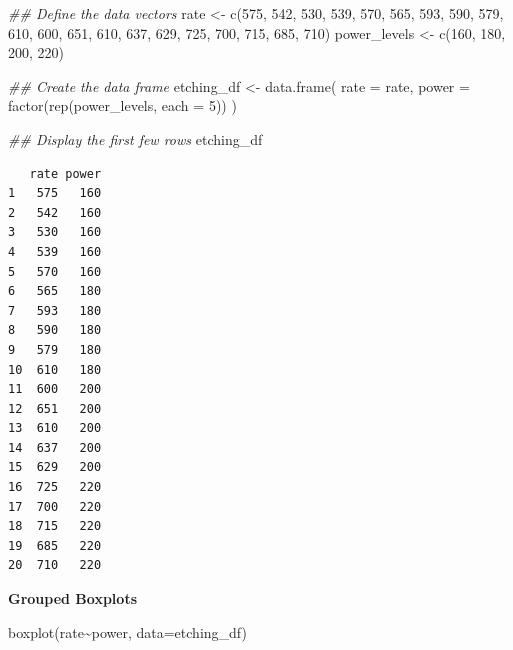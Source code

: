 \documentclass[
  letterpaper,
]{scrbook}
\newenvironment{Shaded}{\begin{snugshade}}{\end{snugshade}}
\newcommand{\AttributeTok}[1]{\textcolor[rgb]{0.40,0.45,0.13}{#1}}
\newcommand{\DecValTok}[1]{\textcolor[rgb]{0.68,0.00,0.00}{#1}}
\newcommand{\DocumentationTok}[1]{\textcolor[rgb]{0.37,0.37,0.37}{\textit{#1}}}
\newcommand{\FunctionTok}[1]{\textcolor[rgb]{0.28,0.35,0.67}{#1}}
\newcommand{\NormalTok}[1]{\textcolor[rgb]{0.00,0.23,0.31}{#1}}
\newcommand{\OtherTok}[1]{\textcolor[rgb]{0.00,0.23,0.31}{#1}}
\newcommand{\SpecialCharTok}[1]{\textcolor[rgb]{0.37,0.37,0.37}{#1}}
\begin{document}
\begin{Shaded}
\begin{Highlighting}[]
\DocumentationTok{\#\# Define the data vectors}
\NormalTok{rate }\OtherTok{\textless{}{-}} \FunctionTok{c}\NormalTok{(}\DecValTok{575}\NormalTok{, }\DecValTok{542}\NormalTok{, }\DecValTok{530}\NormalTok{, }\DecValTok{539}\NormalTok{, }\DecValTok{570}\NormalTok{, }\DecValTok{565}\NormalTok{, }\DecValTok{593}\NormalTok{, }\DecValTok{590}\NormalTok{, }\DecValTok{579}\NormalTok{, }\DecValTok{610}\NormalTok{,}
          \DecValTok{600}\NormalTok{, }\DecValTok{651}\NormalTok{, }\DecValTok{610}\NormalTok{, }\DecValTok{637}\NormalTok{, }\DecValTok{629}\NormalTok{, }\DecValTok{725}\NormalTok{, }\DecValTok{700}\NormalTok{, }\DecValTok{715}\NormalTok{, }\DecValTok{685}\NormalTok{, }\DecValTok{710}\NormalTok{)}
\NormalTok{power\_levels }\OtherTok{\textless{}{-}} \FunctionTok{c}\NormalTok{(}\DecValTok{160}\NormalTok{, }\DecValTok{180}\NormalTok{, }\DecValTok{200}\NormalTok{, }\DecValTok{220}\NormalTok{)}

\DocumentationTok{\#\# Create the data frame}
\NormalTok{etching\_df }\OtherTok{\textless{}{-}} \FunctionTok{data.frame}\NormalTok{(}
  \AttributeTok{rate =}\NormalTok{ rate,}
  \AttributeTok{power =} \FunctionTok{factor}\NormalTok{(}\FunctionTok{rep}\NormalTok{(power\_levels, }\AttributeTok{each =} \DecValTok{5}\NormalTok{))}
\NormalTok{)}

\DocumentationTok{\#\# Display the first few rows}
\NormalTok{etching\_df}
\end{Highlighting}
\end{Shaded}

\begin{verbatim}
   rate power
1   575   160
2   542   160
3   530   160
4   539   160
5   570   160
6   565   180
7   593   180
8   590   180
9   579   180
10  610   180
11  600   200
12  651   200
13  610   200
14  637   200
15  629   200
16  725   220
17  700   220
18  715   220
19  685   220
20  710   220
\end{verbatim}

\textbf{Grouped Boxplots}

\begin{Shaded}
\begin{Highlighting}[]
\FunctionTok{boxplot}\NormalTok{(rate}\SpecialCharTok{\textasciitilde{}}\NormalTok{power, }\AttributeTok{data=}\NormalTok{etching\_df)}
\end{Highlighting}
\end{Shaded}
\end{document}

